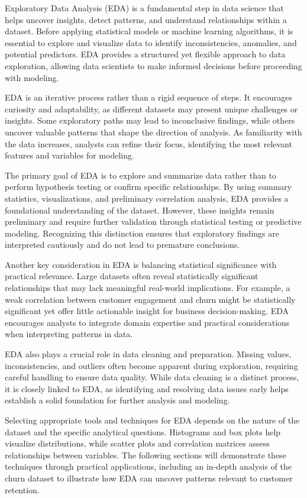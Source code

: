 \documentclass[
  11pt,
]{book}
\theoremstyle{definition}
\theoremstyle{definition}
\theoremstyle{definition}
\theoremstyle{definition}
\theoremstyle{remark}
\begin{document}
Exploratory Data Analysis (EDA) is a fundamental step in data science that helps uncover insights, detect patterns, and understand relationships within a dataset. Before applying statistical models or machine learning algorithms, it is essential to explore and visualize data to identify inconsistencies, anomalies, and potential predictors. EDA provides a structured yet flexible approach to data exploration, allowing data scientists to make informed decisions before proceeding with modeling.

EDA is an iterative process rather than a rigid sequence of steps. It encourages curiosity and adaptability, as different datasets may present unique challenges or insights. Some exploratory paths may lead to inconclusive findings, while others uncover valuable patterns that shape the direction of analysis. As familiarity with the data increases, analysts can refine their focus, identifying the most relevant features and variables for modeling.

The primary goal of EDA is to explore and summarize data rather than to perform hypothesis testing or confirm specific relationships. By using summary statistics, visualizations, and preliminary correlation analysis, EDA provides a foundational understanding of the dataset. However, these insights remain preliminary and require further validation through statistical testing or predictive modeling. Recognizing this distinction ensures that exploratory findings are interpreted cautiously and do not lead to premature conclusions.

Another key consideration in EDA is balancing statistical significance with practical relevance. Large datasets often reveal statistically significant relationships that may lack meaningful real-world implications. For example, a weak correlation between customer engagement and churn might be statistically significant yet offer little actionable insight for business decision-making. EDA encourages analysts to integrate domain expertise and practical considerations when interpreting patterns in data.

EDA also plays a crucial role in data cleaning and preparation. Missing values, inconsistencies, and outliers often become apparent during exploration, requiring careful handling to ensure data quality. While data cleaning is a distinct process, it is closely linked to EDA, as identifying and resolving data issues early helps establish a solid foundation for further analysis and modeling.

Selecting appropriate tools and techniques for EDA depends on the nature of the dataset and the specific analytical questions. Histograms and box plots help visualize distributions, while scatter plots and correlation matrices assess relationships between variables. The following sections will demonstrate these techniques through practical applications, including an in-depth analysis of the churn dataset to illustrate how EDA can uncover patterns relevant to customer retention.
\end{document}
